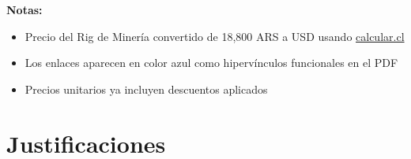 \documentclass{article}
\begin{document}
\vspace{0.5cm}

\noindent\textbf{Notas:}
\begin{itemize}
\item Precio del Rig de Minería convertido de 18,800 ARS a USD usando \href{https://www.calcular.cl/divisas/ars/usd/18800-peso-argentino-a-dolar}{calcular.cl}
\item Los enlaces aparecen en color azul como hipervínculos funcionales en el PDF
\item Precios unitarios ya incluyen descuentos aplicados
\end{itemize}

\newpage

\section*{Justificaciones}
\end{document}

